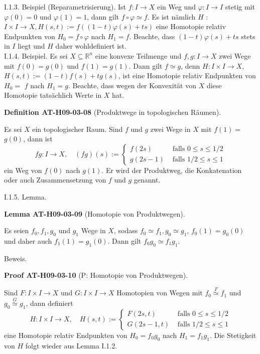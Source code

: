 \documentclass[10pt, letterpaper]{article}
\newcommand{\CustomHeading}[3]{%
  \par\medskip\noindent%
  \textbf{#1 #2} \textnormal{(#3)}.\enskip%
}
\newenvironment{DEF}[2]{\begin{unitbox}\CustomHeading{Definition}{#1}{#2}}{\end{unitbox}}
\newenvironment{LEM}[2]{\begin{unitbox}\CustomHeading{Lemma}{#1}{#2}}{\end{unitbox}}
\newenvironment{PROOF}[2]{\begin{unitbox}\CustomHeading{Proof}{#1}{#2}}{\end{unitbox}}
\begin{document}
I.1.3. Beispiel (Reparametrisierung). Ist $f: I \rightarrow X$ ein Weg und $\varphi: I \rightarrow I$ stetig mit $\varphi(0)=0$ und $\varphi(1)=1$, dann gilt $f \circ \varphi \simeq f$. Es ist nämlich $H$ : $I \times I \rightarrow X, H(s, t):=f((1-t) \varphi(s)+t s)$ eine Homotopie relativ Endpunkten von $H_{0}=f \circ \varphi$ nach $H_{1}=f$. Beachte, dass $(1-t) \varphi(s)+t s$ stets in $I$ liegt und $H$ daher wohldefiniert ist.\\


I.1.4. Beispiel. Es sei $X \subseteq \mathbb{R}^{n}$ eine konvexe Teilmenge und $f, g: I \rightarrow X$ zwei Wege mit $f(0)=g(0)$ und $f(1)=g(1)$. Dann gilt $f \simeq g$, denn $H: I \times I \rightarrow X$, $H(s, t):=(1-t) f(s)+t g(s)$, ist eine Homotopie relativ Endpunkten von $H_{0}=$ $f$ nach $H_{1}=g$. Beachte, dass wegen der Konvexität von $X$ diese Homotopie tatsächlich Werte in $X$ hat.

\begin{DEF}{AT-H09-03-08}{Produktwege in topologischen Räumen}
Es sei $X$ ein topologischer Raum. Sind $f$ und $g$ zwei Wege in $X$ mit $f(1)=$ $g(0)$, dann ist
$$
f g: I \rightarrow X, \quad(f g)(s):= \begin{cases}f(2 s) & \text { falls } 0 \leq s \leq 1 / 2 \\ g(2 s-1) & \text { falls } 1 / 2 \leq s \leq 1\end{cases}
$$
ein Weg von $f(0)$ nach $g(1)$. Er wird der Produktweg, die Konkatenation oder auch Zusammensetzung von $f$ und $g$ genannt.
\end{DEF}


I.1.5. Lemma. 

\begin{LEM}{AT-H09-03-09}{Homotopie von Produktwegen}
Es seien $f_{0}, f_{1}, g_{0}$ und $g_{1}$ Wege in $X$, sodass $f_{0} \simeq f_{1}, g_{0} \simeq g_{1}$, $f_{0}(1)=g_{0}(0)$ und daher auch $f_{1}(1)=g_{1}(0)$. Dann gilt $f_{0} g_{0} \simeq f_{1} g_{1}$.
\end{LEM}

Beweis. 

\begin{PROOF}{AT-H09-03-10}{P: Homotopie von Produktwegen}
Sind $F: I \times I \rightarrow X$ und $G: I \times I \rightarrow X$ Homotopien von Wegen mit $f_{0} \stackrel{F}{\simeq} f_{1}$ und $g_{0} \stackrel{G}{\simeq} g_{1}$, dann definiert
$$
H: I \times I \rightarrow X, \quad H(s, t):= \begin{cases}F(2 s, t) & \text { falls } 0 \leq s \leq 1 / 2 \\ G(2 s-1, t) & \text { falls } 1 / 2 \leq s \leq 1\end{cases}
$$
eine Homotopie relativ Endpunkten von $H_{0}=f_{0} g_{0}$ nach $H_{1}=f_{1} g_{1}$. Die Stetigkeit von $H$ folgt wieder aus Lemma I.1.2.
\end{PROOF}
\end{document}
